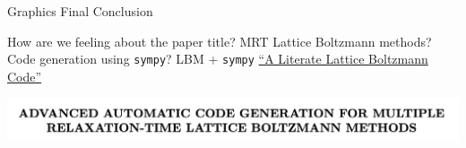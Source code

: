 \begin{frame}{Graphics Final Conclusion}
  \begin{outline}
    \1 How are we feeling about the paper title?
    \2 MRT Lattice Boltzmann methods?
    \2 Code generation using \lstinline{sympy}?
    \1 LBM + \lstinline{sympy}
      \2 \href{http://literatelb.org}{``A Literate Lattice Boltzmann Code''} \cite{web:literatelbm}
  \end{outline}
  \begin{center}
    \includegraphics[width=0.8\linewidth]{title_header.png}
  \end{center}
\end{frame}
